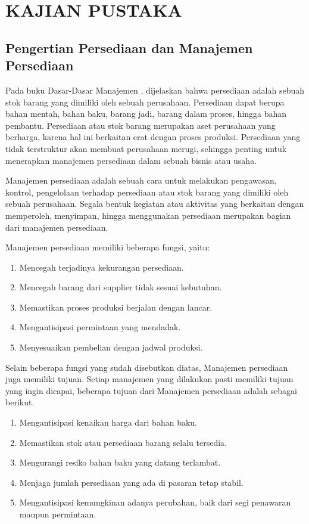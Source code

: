 
\chapter{KAJIAN PUSTAKA} 

\section{Pengertian Persediaan dan Manajemen Persediaan}

Pada buku Dasar-Dasar Manajemen \citep{dasarmanajemen}, dijelaskan bahwa persediaan adalah sebuah stok barang yang dimiliki oleh sebuah perusahaan. Persediaan dapat berupa bahan mentah, bahan baku, barang jadi, barang dalam proses, hingga bahan pembantu. Persediaan atau stok barang merupakan aset perusahaan yang berharga, karena hal ini berkaitan erat dengan proses produksi. Persediaan yang tidak terstruktur akan membuat perusahaan merugi, sehingga penting untuk menerapkan manajemen persediaan dalam sebuah bisnis atau usaha.

Manajemen persediaan adalah sebuah cara untuk melakukan pengawasan, kontrol, pengelolaan terhadap persediaan atau stok barang yang dimiliki oleh sebuah perusahaan. Segala bentuk kegiatan atau aktivitas yang berkaitan dengan memperoleh, menyimpan, hingga menggunakan persediaan merupakan bagian dari manajemen persediaan.

Manajemen persediaan memiliki beberapa fungsi, yaitu:
\begin{enumerate}
	\item Mencegah terjadinya kekurangan persediaan.
	\item Mencegah barang dari supplier tidak sesuai kebutuhan.
	\item Memastikan proses produksi berjalan dengan lancar.
	\item Mengantisipasi permintaan yang mendadak.
	\item Menyesuaikan pembelian dengan jadwal produksi.
\end{enumerate}

Selain beberapa fungsi yang sudah disebutkan diatas, Manajemen persediaan juga memiliki tujuan. Setiap manajemen yang dilakukan pasti memiliki tujuan yang ingin dicapai, beberapa tujuan dari Manajemen persediaan adalah sebagai berikut.
\begin{enumerate}
	\item Mengantisipasi kenaikan harga dari bahan baku.
	\item Memastikan stok atau persediaan barang selalu tersedia.
	\item Mengurangi resiko bahan baku yang datang terlambat.
	\item Menjaga jumlah persediaan yang ada di pasaran tetap stabil.
	\item Mengantisipasi kemungkinan adanya perubahan, baik dari segi penawaran maupun permintaan.
\end{enumerate}

